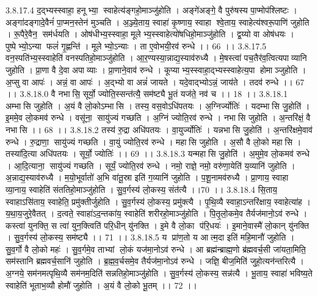 3.8.17.4
द॒द्भ्यस्स्वाहा॒ हनूभ्या॒॒ स्वाहेत्य॑ङ्गहो॒माञ्जु॑होति । अङ्गे॑अङ्गे॒ वै पुरु॑षस्य पा॒प्मोप॑श्लिष्टः । अङ्गा॑दङ्गादे॒वैनं॑ पा॒प्मन॒स्तेन॑ मुञ्चति । अ॒ञ्ज्ये॒ताय॒ स्वाहा॑ कृ॒ष्णाय॒ स्वाहा श्वे॒ताय॒ स्वाहेत्य॑श्वरू॒पाणि॑ जुहोति । रू॒पैरे॒वैन॒॒ सम॑र्धयति । ओष॑धीभ्य॒स्स्वाहा॒ मूलेभ्य॒स्स्वाहेत्यो॑षधिहो॒माञ्जु॑होति । द्व॒य्यो वा ओष॑धयः । पुष्पेभ्यो॒ऽन्या फलं॑ गृ॒ह्णन्ति॑ । मूलेभ्यो॒ऽन्याः । ता ए॒वोभयी॒रव॑ रुन्धे ।। 66 ।।
3.8.17.5
वन॒स्पति॑भ्य॒स्स्वाहेति॑ वनस्पतिहो॒माञ्जु॑होति । आ॒र॒ण्यस्या॒न्नाद्य॒स्याव॑रुध्यै । मे॒षस्त्वा॑ पच॒तैर॑व॒त्वित्यपाव्यानि जुहोति । प्रा॒णा वै दे॒वा अपाव्याः । प्रा॒णाने॒वाव॑ रुन्धे । कूप्याभ्य॒स्स्वाहा॒द्भ्यस्स्वाहेत्य॒पा होमाञ्जुहोति । अ॒प्सु वा आपः॑ । अन्नं॒ वा आपः॑ । अ॒द्भ्यो वा अन्नं॑ जायते । यदे॒वाद्भ्योऽन्नं॒ जाय॑ते । तदव॑ रुन्धे ।। 67 ।।
3.8.18.0
वै नभा॑सि॒ सूर्यो॒ ज्योति॒स्सन्त॑त्यै॒ सम॑ष्ट्यै भू॒तं यज॑ते॒ नव॑ च ।। 18 ।।
3.8.18.1
अम्भा॑सि जुहोति । अ॒यं वै लो॒कोऽम्भा॑सि । तस्य॒ वस॒वोऽधि॑पतयः । अ॒ग्निर्ज्योतिः॑ । यदम्भा॑सि जु॒होति॑ । इ॒ममे॒व लो॒कमव॑ रुन्धे । वसू॑ना॒॒ सायु॑ज्यं गच्छति । अ॒ग्निं ज्योति॒रव॑ रुन्धे । नभा॑सि जुहोति । अ॒न्तरि॑क्षं॒ वै नभा॑सि ।। 68 ।।
3.8.18.2
तस्य॑ रु॒द्रा अधि॑पतयः । वा॒युर्ज्योतिः॑ । यन्नभा॑सि जु॒होति॑ । अ॒न्तरि॑क्षमे॒वाव॑ रुन्धे । रु॒द्राणा॒॒ सायु॑ज्यं गच्छति । वा॒युं ज्योति॒रव॑ रुन्धे । महा॑सि जुहोति । अ॒सौ वै लो॒को महा॑सि । तस्या॑दि॒त्या अधि॑पतयः । सूर्यो॒ ज्योतिः॑ ।। 69 ।।
3.8.18.3
यन्महा॑सि जु॒होति॑ । अ॒मुमे॒व लो॒कमव॑ रुन्धे । आ॒दि॒त्याना॒॒ सायु॑ज्यं गच्छति । सूर्यं॒ ज्योति॒रव॑ रुन्धे । नमो॒ राज्ञे॒ नमो॒ वरु॑णा॒येति॑ य॒व्यानि॑ जुहोति । अ॒न्नाद्य॒स्याव॑रुध्यै । म॒यो॒भूर्वातो॑ अ॒भि वा॑तू॒स्रा इति॑ ग॒व्यानि॑ जुहोति । प॒शू॒नामव॑रुध्यै । प्रा॒णाय॒ स्वाहा व्या॒नाय॒ स्वाहेति॑ संततिहो॒माञ्जु॑होति । सु॒व॒र्गस्य॑ लो॒कस्य॒ संत॑त्यै ।।70 ।।
3.8.18.4
सि॒ताय॒ स्वाहाऽसि॑ताय॒ स्वाहेति॒ प्रमु॑क्तीर्जुहोति । सु॒व॒र्गस्य॑ लो॒कस्य॒ प्रमु॑क्त्यै । पृ॒थि॒व्यै स्वाहा॒ऽन्तरि॑क्षाय॒ स्वाहेत्या॑ह । य॒था॒य॒जुरे॒वैतत् । द॒त्वते॒ स्वाहा॑ऽद॒न्तका॑य॒ स्वाहेति॑ शरीरहो॒माञ्जु॑होति । पि॒तृ॒लो॒कमे॒व तैर्यज॑मानो॒ऽव॑ रुन्धे । कस्त्वा॑ युनक्ति॒ स त्वा॑ युन॒क्त्विति॑ परि॒धीन् यु॑नक्ति । इ॒मे वै लो॒का प॑रि॒धयः॑ । इ॒माने॒वास्मै॑ लो॒कान् यु॑नक्ति । सु॒व॒र्गस्य॑ लो॒कस्य॒ सम॑ष्ट्यै ।। 71 ।।
3.8.18.5
य प्रा॑ण॒तो य आत्म॒दा इति॑ महि॒मानौ॑ जुहोति । सु॒व॒र्गो वै लो॒को महः॑ । सु॒व॒र्गमे॒व ताभ्यां लो॒कं यज॑मा॒नोऽव॑ रुन्धे । आ ब्रह्म॑न्ब्राह्म॒णो ब्र॑ह्मवर्च॒सी जा॑यता॒मिति॒ सम॑स्तानि ब्रह्मवर्च॒सानि॑ जुहोति । ब्र॒ह्म॒व॒र्चसमे॒व तैर्यज॑मा॒नोऽव॑ रुन्धे । जज्ञि॒ बीज॒मिति॑ जुहो॒त्यन॑न्तरित्यै । अ॒ग्नये॒ सम॑नमत्पृथि॒व्यै सम॑नम॒दिति॑ सन्नतिहो॒माञ्जु॑होति । सु॒व॒र्गस्य॑ लो॒कस्य॒ सन्न॑त्यै । भू॒ताय॒ स्वाहा॑ भविष्य॒ते स्वाहेति॑ भूताभ॒व्यौ होमौ॑ जुहोति । अ॒यं वै लो॒को भू॒तम् ।। 72 ।।
